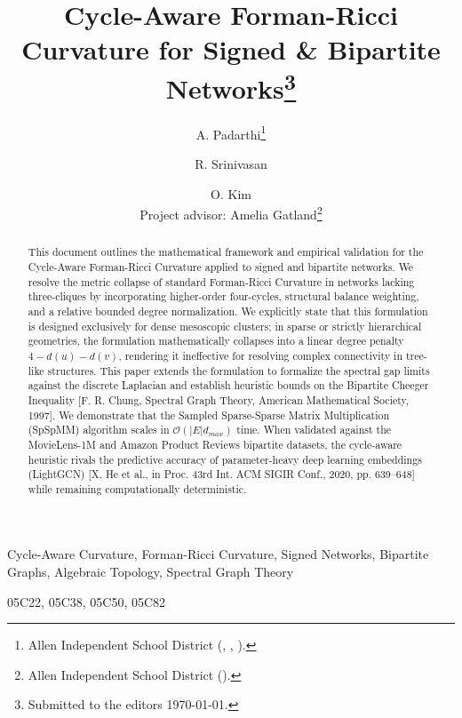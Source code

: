 \documentclass{siuro250211}
\title{Cycle-Aware Forman-Ricci Curvature for Signed \& Bipartite Networks\thanks{Submitted to the editors \today.}}
\author{A. Padarthi\thanks{Allen Independent School District (\email{aryan.padarthi@student.allenisd.org}, \email{raghav.srinivasan@student.allenisd.org}, \email{olivia.kim@student.allenisd.org}).} \and R. Srinivasan\footnotemark[2] \and O. Kim\footnotemark[2] \\ Project advisor: Amelia Gatland\thanks{Allen Independent School District (\email{amelia.gatland@allenisd.org}).}}
\begin{document}
\maketitle

\begin{abstract}
This document outlines the mathematical framework and empirical validation for the Cycle-Aware Forman-Ricci Curvature applied to signed and bipartite networks. We resolve the metric collapse of standard Forman-Ricci Curvature in networks lacking three-cliques by incorporating higher-order four-cycles, structural balance weighting, and a relative bounded degree normalization. We explicitly state that this formulation is designed exclusively for dense mesoscopic clusters; in sparse or strictly hierarchical geometries, the formulation mathematically collapses into a linear degree penalty $4 - d(u) - d(v)$, rendering it ineffective for resolving complex connectivity in tree-like structures. This paper extends the formulation to formalize the spectral gap limits against the discrete Laplacian and establish heuristic bounds on the Bipartite Cheeger Inequality [F. R. Chung, Spectral Graph Theory, American Mathematical Society, 1997]. We demonstrate that the Sampled Sparse-Sparse Matrix Multiplication (SpSpMM) algorithm scales in $\mathcal{O}(|E|d_{max})$ time. When validated against the MovieLens-1M and Amazon Product Reviews bipartite datasets, the cycle-aware heuristic rivals the predictive accuracy of parameter-heavy deep learning embeddings (LightGCN) [X. He et al., in Proc. 43rd Int. ACM SIGIR Conf., 2020, pp. 639--648] while remaining computationally deterministic.
\end{abstract}

\begin{keywords}
Cycle-Aware Curvature, Forman-Ricci Curvature, Signed Networks, Bipartite Graphs, Algebraic Topology, Spectral Graph Theory
\end{keywords}

\begin{AMS}
05C22, 05C38, 05C50, 05C82
\end{AMS}
\end{document}
